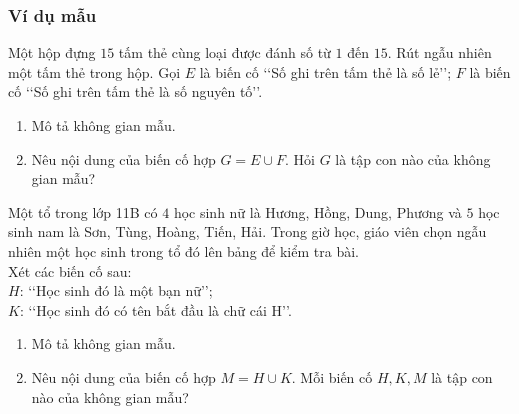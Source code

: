 \subsubsection{Ví dụ mẫu}
\begin{vd}%
	Một hộp đựng $15$ tấm thẻ cùng loại được đánh số từ $1$ đến $15$. Rút ngẫu nhiên một tấm thẻ trong hộp. Gọi $E$ là biến cố \lq\lq Số ghi trên tấm thẻ là số lẻ\rq\rq; $F$ là biến cố \lq\lq Số ghi trên tấm thẻ là số nguyên tố\rq\rq.
	\begin{enumerate}
		\item Mô tả không gian mẫu.
		\item Nêu nội dung của biến cố hợp $G=E \cup F$. Hỏi $G$ là tập con nào của không gian mẫu?
	\end{enumerate}
\end{vd}
\begin{vd}%
	Một tổ trong lớp 11B có $4$ học sinh nữ là Hương, Hồng, Dung, Phương và $5$ học sinh nam là Sơn, Tùng, Hoàng, Tiến, Hải. Trong giờ học, giáo viên chọn ngẫu nhiên một học sinh trong tổ đó lên bảng để kiểm tra bài.\\
	Xét các biến cố sau:\\
	$H$: \lq\lq Học sinh đó là một bạn nữ\rq\rq;\\
	$K$: \lq\lq Học sinh đó có tên bắt đầu là chữ cái $\mathrm{H}$\rq\rq.
	\begin{enumerate}
		\item Mô tả không gian mẫu.
		\item Nêu nội dung của biến cố hợp $M=H \cup K$. Mỗi biến cố $H, K, M$ là tập con nào của không gian mẫu?
	\end{enumerate}
\end{vd}
